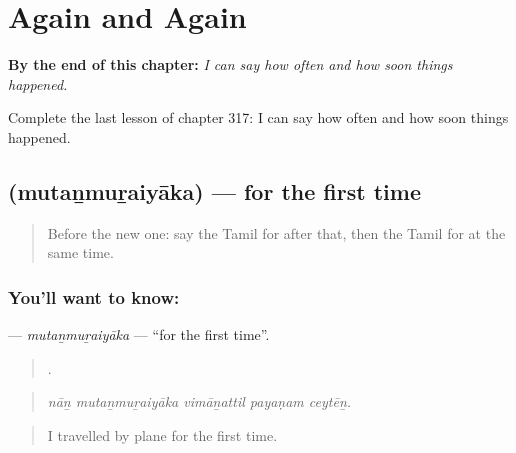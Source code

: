 
\chapter{Again and Again}
\label{ch:ta-again-and-again}

\begin{chapteropening}
\textbf{By the end of this chapter:} \emph{I can say how often and how soon things happened.}

Complete the last lesson of chapter 317: I can say how often and how soon things happened.
\end{chapteropening}

\section[\texorpdfstring{\ta{முதன்முறையாக} (mutaṉmuṟaiyāka)}{முதன்முறையாக (mutaṉmuṟaiyāka)}]{ (mutaṉmuṟaiyāka) — for the first time}

\label{lesson:TA-C317-mutanmuraiyaka}



\begin{quote}
Before the new one: say the Tamil for after that, then the Tamil for at the same time.
\end{quote}

\subsection*{You'll want to know: }
\textbf{} — \emph{mutaṉmuṟaiyāka} — \textquotedblleft{}for the first time\textquotedblright{}.

\begin{quote}
    .
\end{quote}

\begin{quote}
\emph{nāṉ mutaṉmuṟaiyāka vimāṉattil payaṇam ceytēṉ.}
\end{quote}

\begin{quote}
I travelled by plane for the first time.
\end{quote}

